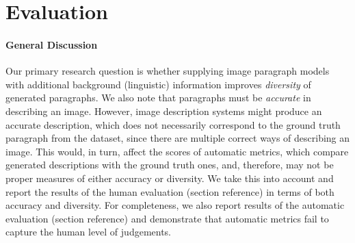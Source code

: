 \documentclass[11pt,a4paper]{article}
\begin{document}

\section{Evaluation}

\iffalse
\paragraph{General Discussion}
Our primary research question is whether supplying image paragraph models with additional background (linguistic) information improves \textit{diversity} of generated paragraphs.
We also note that paragraphs must be \textit{accurate} in describing an image.
However, image description systems might produce an accurate description, which does not necessarily correspond to the ground truth paragraph from the dataset, since there are multiple correct ways of describing an image.
This would, in turn, affect the scores of automatic metrics, which compare generated descriptions with the ground truth ones, and, therefore, may not be proper measures of either accuracy or diversity.
We take this into account and report the results of the human evaluation (section reference) in terms of both accuracy and diversity.
For completeness, we also report results of the automatic evaluation (section reference) and demonstrate that automatic metrics fail to capture the human level of judgements.
\end{document}
